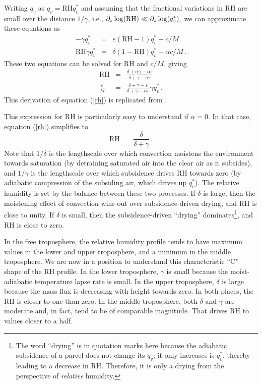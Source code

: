\documentclass[12pt]{article}
\begin{document}
Writing $q_v$ as $q_v = \text{RH} q_v^*$ and assuming that the fractional variations in RH are small over the distance $1/\gamma$, i.e., $\partial_z \log(\text{RH}) \ll \partial_z \log(q_v^*)$, we can approximate these equations as
\begin{eqnarray}
-\gamma q_v^* &=& \varepsilon (\text{RH} - 1) q_v^* - c/M \label{bpc_2} \\
\text{RH} \gamma q_v^* &=& \delta (1 - \text{RH}) q_v^* + \alpha c/M \, . \label{bpe_2}
\end{eqnarray}
These two equations can be solved for RH and $c/M$, giving
\begin{eqnarray}
\text{RH} &=& \frac{\delta + \alpha \gamma - \alpha \varepsilon}{\delta + \gamma - \alpha \varepsilon} \label{rh} \\
\frac{c}{M} &=& \frac{\delta + \gamma - \varepsilon}{\delta + \gamma - \alpha \varepsilon} \gamma q_v^* \, . \label{cond}
\end{eqnarray}
This derivation of equation (\ref{rh}) is replicated from \citet{13lapse}.


This expression for RH is particularly easy to understand if $\alpha=0$.  In that case, equation (\ref{rh}) simplifies to
\begin{equation}
\text{RH} \; = \; \frac{\delta}{\delta + \gamma} \, . \label{rh_ito_gamma_delta}
\end{equation}
Note that $1/\delta$ is the lengthscale over which convection moistens the environment towards saturation (by detraining saturated air into the clear air as it subsides), and $1/\gamma$ is the lengthscale over which subsidence drives RH towards zero (by adiabatic compression of the subsiding air, which drives up $q_v^*$).  The relative humidity is set by the balance between these two processes.  If $\delta$ is large, then the moistening effect of convection wins out over subsidence-driven drying, and RH is close to unity.  If $\delta$ is small, then the subsidence-driven ``drying'' dominates\footnote{The word ``drying'' is in quotation marks here because the adiabatic subsidence of a parcel does not change its $q_v$; it only increases is $q_v^*$, thereby leading to a decrease in RH.  Therefore, it is only a drying from the perspective of {\it relative} humidity.}, and RH is close to zero.


In the free troposphere, the relative humidity profile tends to have maximum values in the lower and upper troposphere, and a minimum in the middle troposphere.  We are now in a position to understand this characteristic ``C'' shape of the RH profile.  In the lower troposphere, $\gamma$ is small because the moist-adiabatic temperature lapse rate is small.  In the upper troposphere, $\delta$ is large because the mass flux is decreasing with height towards zero.  In both places, the RH is closer to one than zero.  In the middle troposphere, both $\delta$ and $\gamma$ are moderate and, in fact, tend to be of comparable magnitude.  That drives RH to values closer to a half.
\end{document}
